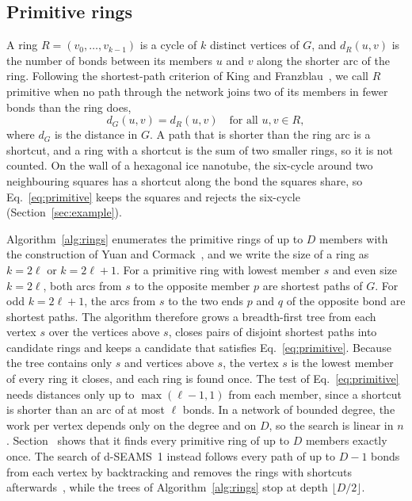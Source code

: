 \documentclass[preprint,12pt]{elsarticle}
\newcounter{bla}
\begin{document}
\subsection{Primitive rings}
\label{sec:rings}

A ring $R=(v_0,\dots,v_{k-1})$ is a cycle of $k$ distinct vertices of $G$, and $d_R(u,v)$ is the number of bonds between its members $u$ and $v$ along the shorter arc of the ring.
Following the shortest-path criterion of King and Franzblau~\cite{king1967ring,franzblau1993computation,goswami2020dseams}, we call $R$ primitive when no path through the network joins two of its members in fewer bonds than the ring does,
\begin{equation}
  d_G(u,v)=d_R(u,v)\quad\text{for all } u,v\in R,
  \label{eq:primitive}
\end{equation}
where $d_G$ is the distance in $G$.
A path that is shorter than the ring arc is a shortcut, and a ring with a shortcut is the sum of two smaller rings, so it is not counted.
On the wall of a hexagonal ice nanotube, the six-cycle around two neighbouring squares has a shortcut along the bond the squares share, so Eq.~\eqref{eq:primitive} keeps the squares and rejects the six-cycle (Section~\ref{sec:example}).

Algorithm~\ref{alg:rings} enumerates the primitive rings of up to $D$ members with the construction of Yuan and Cormack~\cite{yuan2002rings}, and we write the size of a ring as $k=2\ell$ or $k=2\ell+1$.
For a primitive ring with lowest member $s$ and even size $k=2\ell$, both arcs from $s$ to the opposite member $p$ are shortest paths of $G$.
For odd $k=2\ell+1$, the arcs from $s$ to the two ends $p$ and $q$ of the opposite bond are shortest paths.
The algorithm therefore grows a breadth-first tree from each vertex $s$ over the vertices above $s$, closes pairs of disjoint shortest paths into candidate rings and keeps a candidate that satisfies Eq.~\eqref{eq:primitive}.
Because the tree contains only $s$ and vertices above $s$, the vertex $s$ is the lowest member of every ring it closes, and each ring is found once.
The test of Eq.~\eqref{eq:primitive} needs distances only up to $\max(\ell-1,1)$ from each member, since a shortcut is shorter than an arc of at most $\ell$ bonds.
In a network of bounded degree, the work per vertex depends only on the degree and on $D$, so the search is linear in $n$.
Section~ shows that it finds every primitive ring of up to $D$ members exactly once.
The search of d-SEAMS~1 instead follows every path of up to $D-1$ bonds from each vertex by backtracking and removes the rings with shortcuts afterwards~\cite{goswami2020dseams}, while the trees of Algorithm~\ref{alg:rings} stop at depth $\lfloor D/2\rfloor$.
\end{document}
